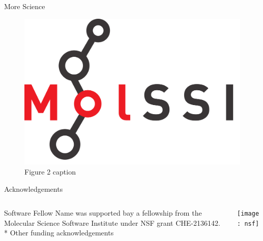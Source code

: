 \documentclass{beamer}
\begin{document}
\begin{frame}
\begin{columns}[t]
\begin{column}{.417\linewidth}
        \begin{section}{More Science}
          \lipsum[1-4]

          \begin{figure}[h]
            \includegraphics[width=0.65\linewidth]{./images/molssi_main_logo.png}
            \caption{Figure 2 caption}
          \end{figure}
        \end{section}

        \begin{section}{Acknowledgements}
          \begin{columns}
            \begin{column}{.75\linewidth}
            Software Fellow Name was supported bay a fellowship from the Molecular Science Software Institute under NSF grant  CHE-2136142.\\
* Other funding acknowledgements
            \end{column}
            \begin{column}{.2\linewidth}
              \texttt{[image: nsf]}
            \end{column}
          \end{columns}

        \end{section} 

      \end{column}

    \end{columns}

  \end{frame}
\end{document}
